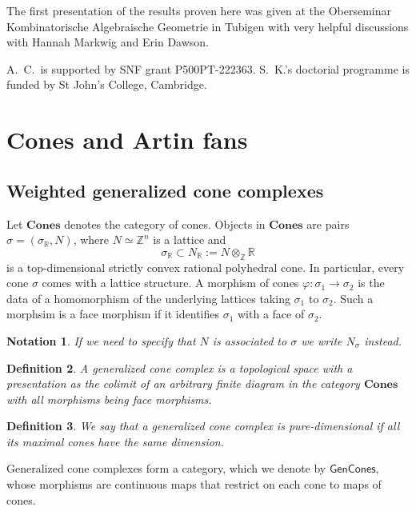 \documentclass{article}
\newtheorem{definition}{Definition}[section]
\newtheorem{notation}[definition]{Notation}
\begin{document}
The first presentation of the results proven here was given at the Oberseminar Kombinatorische Algebraische Geometrie in Tubigen with very helpful discussions with Hannah Markwig and Erin Dawson.

A.~C.\ is supported by SNF grant P500PT-222363. S.~K.'s doctorial programme is funded by St John's College, Cambridge. 


\section{Cones and Artin fans}



\subsection{Weighted generalized cone complexes}\label{sec: cones}

Let $\mathbf{Cones}$ denotes the category of cones. Objects in  $\mathbf{Cones}$ are pairs $\sigma = (\sigma_{\mathbb{R}}, N)$, where $N \simeq \mathbb{Z}^n$ is a lattice and 
\[
    \sigma_{\mathbb{R}} \subset N_{\mathbb{R}} := N \otimes_{\mathbb{Z}} \mathbb{R}
\]
is a top-dimensional strictly convex rational polyhedral cone.  In particular, every cone $\sigma$ comes with a lattice structure. A morphism of cones $\varphi: \sigma_1 \to \sigma_2$ is the data of a homomorphism of the underlying lattices taking $\sigma_1$ to $\sigma_2$. Such a morphsim is a face morphism if it identifies $\sigma_1$ with a face of $\sigma_2$.

\begin{notation}\label{notation: Nsigma}
    If we need to specify that $N$ is associated to $\sigma$ we write $N_\sigma$ instead.
\end{notation}

\begin{definition}\label{def: cones}
    A generalized cone complex is a topological space with a presentation as the colimit of an arbitrary finite diagram in the category $\mathbf{Cones}$ with all morphisms being face morphisms. 
\end{definition}

\begin{definition}
    We say that a generalized cone complex is pure-dimensional if all its maximal cones have the same dimension.
\end{definition}

Generalized cone complexes form a category, which we denote by $\mathsf{GenCones}$, whose morphisms are continuous maps that restrict on each cone to maps of cones.
\end{document}
